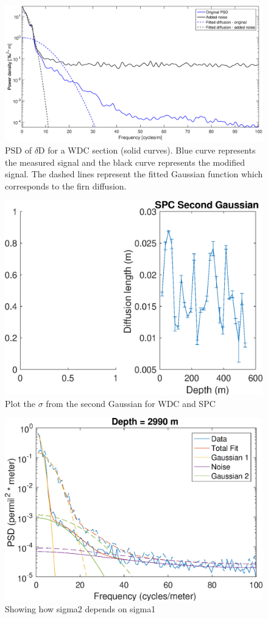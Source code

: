 \documentclass[draft, jgrga]{AGUTeX}
\begin{document}
\begin{figure}
	\includegraphics[width=.9\linewidth]{WAIS_spectrum_added_noise.eps}
	\caption{PSD of $\delta$D for a WDC section (solid curves). Blue curve represents
		the measured signal and the black curve represents the modified signal.
		The dashed lines represent the fitted Gaussian function which
		corresponds to the firn diffusion.} \label{WAIS_spectrum_added_noise}
\end{figure}

\begin{figure}
\includegraphics[width=.9\linewidth]{sigma2.eps}
\caption{Plot the $\sigma$ from the second Gaussian for WDC and SPC}\label{sigma2}
\end{figure}

\begin{figure}
\includegraphics[width=.9\linewidth]{sigmadependence.eps}
\caption{Showing how sigma2 depends on sigma1}\label{sigmadependence}
\end{figure}
\end{document}
